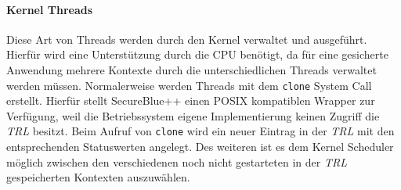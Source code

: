 \documentclass[ngerman]{sig-alternate-05-2015}
\begin{document}
\paragraph{Kernel Threads}
Diese Art von Threads werden durch den Kernel verwaltet und ausgeführt. Hierfür wird eine Unterstützung durch die CPU benötigt, da für eine gesicherte Anwendung mehrere Kontexte durch die unterschiedlichen Threads verwaltet werden müssen. Normalerweise werden Threads mit dem \texttt{clone} System Call erstellt. Hierfür stellt SecureBlue++ einen POSIX kompatiblen Wrapper zur Verfügung, weil die Betriebssystem eigene Implementierung keinen Zugriff die \emph{TRL} besitzt. Beim Aufruf von \texttt{clone} wird ein neuer Eintrag in der \emph{TRL} mit den entsprechenden Statuswerten angelegt. Des weiteren ist es dem Kernel Scheduler möglich zwischen den verschiedenen noch nicht gestarteten in der \emph{TRL} gespeicherten Kontexten auszuwählen.
\end{document}
